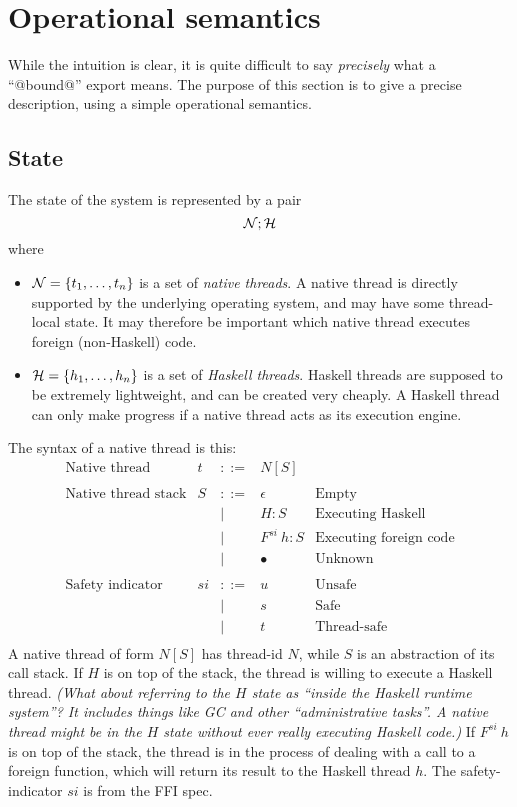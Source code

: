 \documentclass{article}
\newcommand{\NS}{{\cal N}}
\newcommand{\HS}{{\cal H}}
\newcommand{\hcall}{H}
\newcommand{\fcall}[2]{F^{#1}~#2}
\begin{document}
\section{Operational semantics}

While the intuition is clear, it is quite difficult to say \emph{precisely} what a ``@bound@'' export means.
The purpose of this section is to give a precise description, using a simple operational semantics.


\subsection{State}

The state of the system is represented by a pair
$$\NS ; \HS$$
where 
\begin{itemize}
\item $\NS = \{t_1, \ldots ,t_n\}$ is a set of \emph{native threads}.
A native thread is directly supported by the underlying operating
system, and may have some thread-local state. It may therefore
be important which native thread executes foreign
(non-Haskell) code.

\item $\HS = \{h_1, \ldots ,h_n\}$ is a set of \emph{Haskell threads}.
Haskell threads are supposed to be extremely lightweight, and
can be created very cheaply. A Haskell thread can only make progress
if a native thread acts as its execution engine.
\end{itemize}

The syntax of a native thread is this:
$$
\begin{array}{lrcll}
\mbox{Native thread} &  t & ::= & N[S] \\
\\
\mbox{Native thread stack} &  S & ::= & \epsilon & \mbox{Empty}\\
	& & | & \hcall : S  & \mbox{Executing Haskell} \\
	& & | & \fcall{si}{h} : S & \mbox{Executing foreign code}\\
	& & | & \bullet & \mbox{Unknown}\\
\\
\mbox{Safety indicator} &  si & ::= & u & \mbox{Unsafe} \\
	& & | & s & \mbox{Safe} \\
	& & | & t & \mbox{Thread-safe} \\
\end{array}
$$
A native thread of form $N[S]$ has thread-id $N$, while $S$ is
an abstraction of its call stack.  If $\hcall$ is on top of the stack,
the thread is willing to execute a Haskell thread.
\emph{(What about referring to the $\hcall$ state as
``inside the Haskell runtime system''? It includes things like GC and other
``administrative tasks''. A native thread might be in the $\hcall$ state 
without ever really executing Haskell code.)}
If $\fcall{si}{h}$ is
on top of the stack, the thread is in the process of dealing with a call
to a foreign function, which will return its result to the Haskell thread
$h$.  The safety-indicator $si$ is from the FFI spec.
\end{document}
